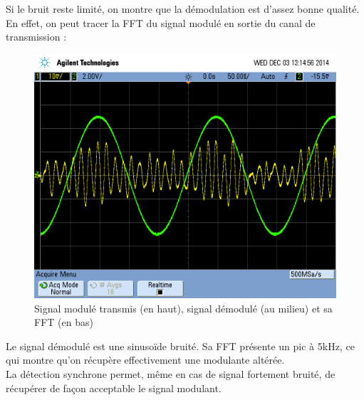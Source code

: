 \documentclass[../../Cours_M1.tex]{subfiles}
\begin{document}
Si le bruit reste limité, on montre que la démodulation est d'assez bonne qualité. En effet, on peut tracer la FFT du signal modulé en sortie du canal de transmission :

\begin{figure}[h!]
\centering
\includegraphics[scale=0.2]{NoiseMod.png}
\caption{Signal modulé transmis (en haut), signal démodulé (au milieu) et sa FFT (en bas)}
\end{figure}

Le signal démodulé est une sinusoïde bruité. Sa FFT présente un pic à 5kHz, ce qui montre qu'on récupère effectivement une modulante altérée.\\

La détection synchrone permet, même en cas de signal fortement bruité, de récupérer de façon acceptable le signal modulant.
\end{document}
